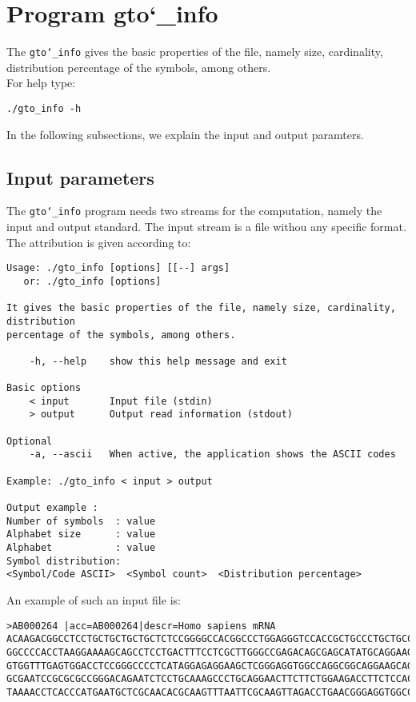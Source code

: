 \section{Program gto\char`_info}
The \texttt{gto\char`_info} gives the basic properties of the file, namely size, cardinality, distribution percentage of the symbols, among others.\\
For help type:
\begin{lstlisting}
./gto_info -h
\end{lstlisting}
In the following subsections, we explain the input and output paramters.

\subsection*{Input parameters}

The \texttt{gto\char`_info} program needs two streams for the computation, namely the input and output standard. The input stream is a file withou any specific format.\\
The attribution is given according to:
\begin{lstlisting}
Usage: ./gto_info [options] [[--] args]
   or: ./gto_info [options]

It gives the basic properties of the file, namely size, cardinality, distribution 
percentage of the symbols, among others.

    -h, --help    show this help message and exit

Basic options
    < input       Input file (stdin)
    > output      Output read information (stdout)

Optional
    -a, --ascii   When active, the application shows the ASCII codes

Example: ./gto_info < input > output

Output example :
Number of symbols  : value
Alphabet size      : value
Alphabet           : value
Symbol distribution:
<Symbol/Code ASCII>  <Symbol count>  <Distribution percentage>
\end{lstlisting}
An example of such an input file is:
\begin{lstlisting}
>AB000264 |acc=AB000264|descr=Homo sapiens mRNA 
ACAAGACGGCCTCCTGCTGCTGCTGCTCTCCGGGGCCACGGCCCTGGAGGGTCCACCGCTGCCCTGCTGCCATTGTCCCC
GGCCCCACCTAAGGAAAAGCAGCCTCCTGACTTTCCTCGCTTGGGCCGAGACAGCGAGCATATGCAGGAAGCGGCAGGAA
GTGGTTTGAGTGGACCTCCGGGCCCCTCATAGGAGAGGAAGCTCGGGAGGTGGCCAGGCGGCAGGAAGCAGGCCAGTGCC
GCGAATCCGCGCGCCGGGACAGAATCTCCTGCAAAGCCCTGCAGGAACTTCTTCTGGAAGACCTTCTCCACCCCCCCAGC
TAAAACCTCACCCATGAATGCTCGCAACACGCAAGTTTAATTCGCAAGTTAGACCTGAACGGGAGGTGGCCACGCAAGTT
\end{lstlisting}

